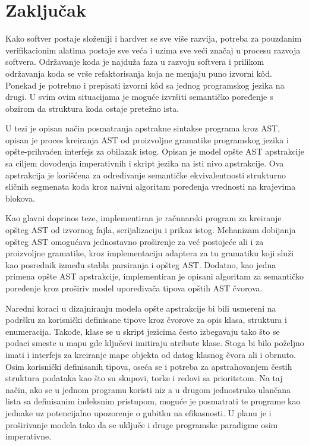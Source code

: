 \chapter{Zaključak}
\label{chp:conclusion}

Kako softver postaje složeniji i hardver se sve više razvija, potreba za pouzdanim verifikacionim alatima postaje sve veća i uzima sve veći značaj u procesu razvoja softvera. Održavanje koda je najduža faza u razvoju softvera i prilikom održavanja koda se vrše refaktorisanja koja ne menjaju puno izvorni k\^od. Ponekad je potrebno i prepisati izvorni k\^od sa jednog programskog jezika na drugi. U svim ovim situacijama je moguće izvršiti semantičko poređenje s obzirom da struktura koda ostaje pretežno ista. 

U tezi je opisan način posmatranja apstrakne sintakse programa kroz AST, opisan je proces kreiranja AST od proizvoljne gramatike programskog jezika i opšte-prihvaćen interfejs za obilazak istog. Opisan je model opšte AST apstrakcije sa ciljem dovođenja imperativnih i skript jezika na isti nivo apstrakcije. Ova apstrakcija je korišćena za određivanje semantičke ekvivalentnosti strukturno sličnih segmenata koda kroz naivni algoritam poređenja vrednosti na krajevima blokova.

Kao glavni doprinos teze, implementiran je računarski program za kreiranje opšteg AST od izvornog fajla, serijalizaciju i prikaz istog. Mehanizam dobijanja opšteg AST omogućava jednostavno proširenje za već postojeće ali i za proizvoljne gramatike, kroz implementaciju adaptera za tu gramatiku koji služi kao posrednik između stabla parsiranja i opšteg AST. Dodatno, kao jedna primena opšte AST apstrakcije, implementiran je opisani algoritam za semantičko poređenje kroz proširiv model upoređivača tipova opštih AST čvorova.

Naredni koraci u dizajniranju modela opšte apstrakcije bi bili usmereni na podršku za korisnički definisane tipove kroz čvorove za opis klasa, struktura i enumeracija. Takođe, klase se u skript jezicima često izbegavaju tako što se podaci smeste u mapu gde ključevi imitiraju atribute klase. Stoga bi bilo poželjno imati i interfejs za kreiranje mape objekta od datog klasnog čvora ali i obrnuto. Osim korisnički definisanih tipova, oseća se i potreba za apstrahovanjem čestih struktura podataka kao što su skupovi, torke i redovi sa prioritetom. Na taj način, ako se u jednom programu koristi niz a u drugom jednostruko ulančana lista sa definisanim indeksnim pristupom, moguće je posmatrati te programe kao jednake uz potencijalno upozorenje o gubitku na efikasnosti. U planu je i proširivanje modela tako da se uključe i druge programske paradigme osim imperativne.

